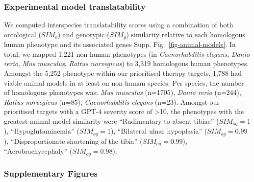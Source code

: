 \documentclass[
]{article}
\begin{document}
\subsubsection{Experimental model
translatability}\label{experimental-model-translatability-1}

We computed interspecies translatability scores using a combination of
both ontological (\(SIM_{o}\)) and genotypic (\(SIM_{g}\)) similarity
relative to each homologous human phenotype and its associated genes
Supp. Fig.~\ref{fig-animal-models}. In total, we mapped 1,221 non-human
phenotypes (in \emph{Caenorhabditis elegans}, \emph{Danio rerio},
\emph{Mus musculus}, \emph{Rattus norvegicus}) to 3,319 homologous human
phenotypes. Amongst the 5,252 phenotype within our prioritised therapy
targets, 1,788 had viable animal models in at least on non-human
species. Per species, the number of homologous phenotypes was: \emph{Mus
musculus} (n=1705), \emph{Danio rerio} (n=244), \emph{Rattus norvegicus}
(n=85), \emph{Caenorhabditis elegans} (n=23). Amongst our prioritised
targets with a GPT-4 severity score of \textgreater10, the phenotypes
with the greatest animal model similarity were ``Rudimentary to absent
tibiae'' (\(SIM_{og}=1\)), ``Hypoglutaminemia'' (\(SIM_{og}=1\)),
``Bilateral ulnar hypoplasia'' (\(SIM_{og}=0.99\)), ``Disproportionate
shortening of the tibia'' (\(SIM_{og}=0.99\)), ``Acrobrachycephaly''
(\(SIM_{og}=0.98\)).

\subsubsection{Supplementary Figures}\label{supplementary-figures}
\end{document}
